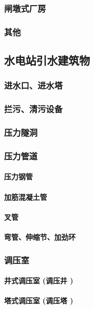 \documentclass[UTF8]{../../ApplicationUniverse}
\begin{document}
        \subsubsection{闸墩式厂房}
        \subsubsection{其他}
    \subsection{水电站引水建筑物}
        \subsubsection{进水口、进水塔}
        \subsubsection{拦污、清污设备}
        \subsubsection{压力隧洞}
        \subsubsection{压力管道}
            \paragraph{压力钢管}
            \paragraph{加筋混凝土管}
            \paragraph{叉管}
            \paragraph{弯管、伸缩节、加劲环}
        \subsubsection{调压室}
            \paragraph{井式调压室 (调压井 )}
            \paragraph{塔式调压室 (调压塔 )}
\end{document}
